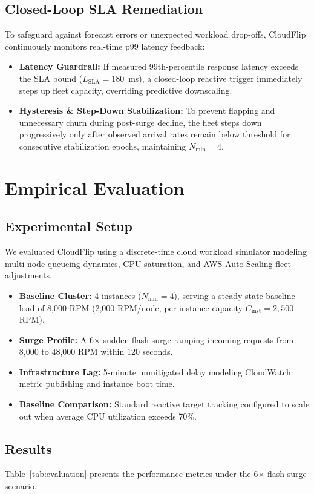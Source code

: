 \documentclass[10pt,journal,compsoc]{IEEEtran}
\begin{document}
\subsection{Closed-Loop SLA Remediation}
To safeguard against forecast errors or unexpected workload drop-offs, CloudFlip continuously monitors real-time p99 latency feedback:
\begin{itemize}
    \item \textbf{Latency Guardrail:} If measured 99th-percentile response latency exceeds the SLA bound ($L_{\text{SLA}} = 180$~ms), a closed-loop reactive trigger immediately steps up fleet capacity, overriding predictive downscaling.
    \item \textbf{Hysteresis \& Step-Down Stabilization:} To prevent flapping and unnecessary churn during post-surge decline, the fleet steps down progressively only after observed arrival rates remain below threshold for consecutive stabilization epochs, maintaining $N_{\min} = 4$.
\end{itemize}

\section{Empirical Evaluation}
\subsection{Experimental Setup}
We evaluated CloudFlip using a discrete-time cloud workload simulator modeling multi-node queueing dynamics, CPU saturation, and AWS Auto Scaling fleet adjustments. 
\begin{itemize}
    \item \textbf{Baseline Cluster:} 4 instances ($N_{\min} = 4$), serving a steady-state baseline load of 8,000 RPM (2,000 RPM/node, per-instance capacity $C_{\text{inst}} = 2,500$ RPM).
    \item \textbf{Surge Profile:} A 6$\times$ sudden flash surge ramping incoming requests from 8,000 to 48,000 RPM within 120 seconds.
    \item \textbf{Infrastructure Lag:} 5-minute unmitigated delay modeling CloudWatch metric publishing and instance boot time.
    \item \textbf{Baseline Comparison:} Standard reactive target tracking configured to scale out when average CPU utilization exceeds 70\%.
\end{itemize}

\subsection{Results}
Table~\ref{tab:evaluation} presents the performance metrics under the 6$\times$ flash-surge scenario.
\end{document}
